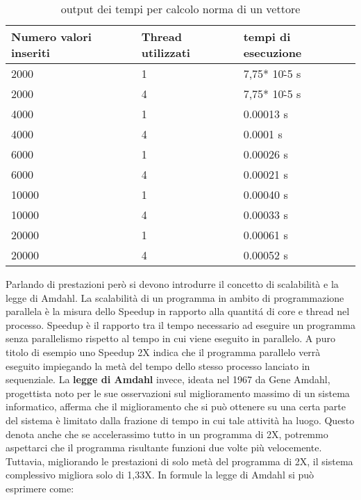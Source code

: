{\begin{table}[!htb]
	\begin{center}
		\begin{tabular}{|p{}|p{}|p{}|}
			\hline
			Numero valori inseriti          &Thread utilizzati       &  tempi di esecuzione     \\
			\hline
			2000            & 1            	&	7,75* 10\^-5 s	\\
			2000                & 4            	&	7,75* 10\^-5 s	\\
			\hline
			4000            & 1     	   	&  0.00013 s     \\
			4000		        & 4     	   	&  0.0001  s     \\
			\hline
			6000          	& 1     		&   0.00026 s   \\
			6000	            & 4             &   0.00021 s   \\
			\hline
			10000          	& 1     		&   0.00040 s   \\
			10000				& 4             &   0.00033 s   \\
			\hline
			20000          	& 1     		&   0.00061 s   \\
			20000				& 4             &   0.00052 s   \\
			\hline
		\end{tabular}
		\caption{output dei tempi per calcolo norma di un vettore \label{tab:threadsOutput}}
	\end{center}
\end{table}
Parlando di prestazioni per\`o si devono introdurre il concetto di scalabilit\`a e la legge di Amdahl.
La scalabilit\`a di un programma in ambito di programmazione parallela \`e la misura dello Speedup in rapporto alla quantit\'a di core e thread nel processo. Speedup \`e il rapporto tra il tempo necessario ad eseguire un programma senza parallelismo rispetto al tempo in cui viene eseguito in parallelo. A puro titolo di esempio uno Speedup 2X indica che il programma parallelo verr\`a eseguito impiegando la met\`a del tempo dello stesso processo lanciato in sequenziale.
La \textbf{legge di Amdahl} invece, ideata nel 1967 da Gene Amdahl, progettista noto per le sue osservazioni sul miglioramento massimo di un sistema informatico, afferma che il miglioramento che si pu\`o ottenere su una certa parte del sistema \`e limitato dalla frazione di tempo in cui tale attivit\`a ha luogo. Questo denota anche che se accelerassimo tutto in un programma di 2X, potremmo aspettarci che il programma risultante funzioni due volte pi\`u velocemente. Tuttavia, migliorando le prestazioni di solo met\`a del programma di 2X, il sistema complessivo migliora solo di 1,33X. In formule la legge di Amdahl si pu\`o esprimere come:\\
}
